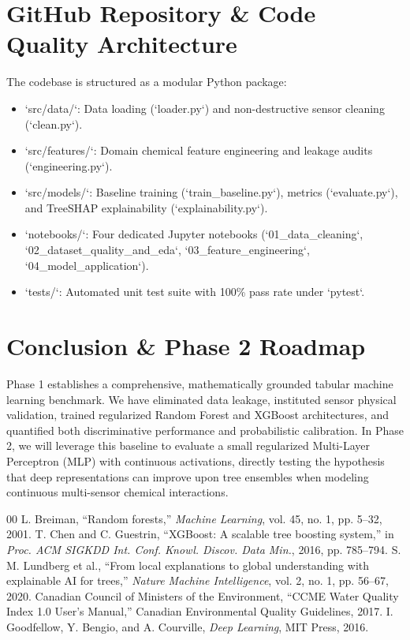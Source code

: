\documentclass[conference]{IEEEtran}
\begin{document}
\section{GitHub Repository \& Code Quality Architecture}
The codebase is structured as a modular Python package:
\begin{itemize}
    \item `src/data/`: Data loading (`loader.py`) and non-destructive sensor cleaning (`clean.py`).
    \item `src/features/`: Domain chemical feature engineering and leakage audits (`engineering.py`).
    \item `src/models/`: Baseline training (`train_baseline.py`), metrics (`evaluate.py`), and TreeSHAP explainability (`explainability.py`).
    \item `notebooks/`: Four dedicated Jupyter notebooks (`01_data_cleaning`, `02_dataset_quality_and_eda`, `03_feature_engineering`, `04_model_application`).
    \item `tests/`: Automated unit test suite with 100\% pass rate under `pytest`.
\end{itemize}

\section{Conclusion \& Phase 2 Roadmap}
Phase 1 establishes a comprehensive, mathematically grounded tabular machine learning benchmark. We have eliminated data leakage, instituted sensor physical validation, trained regularized Random Forest and XGBoost architectures, and quantified both discriminative performance and probabilistic calibration. In Phase 2, we will leverage this baseline to evaluate a small regularized Multi-Layer Perceptron (MLP) with continuous activations, directly testing the hypothesis that deep representations can improve upon tree ensembles when modeling continuous multi-sensor chemical interactions.

\begin{thebibliography}{00}
 L. Breiman, ``Random forests,'' \textit{Machine Learning}, vol. 45, no. 1, pp. 5--32, 2001.
 T. Chen and C. Guestrin, ``XGBoost: A scalable tree boosting system,'' in \textit{Proc. ACM SIGKDD Int. Conf. Knowl. Discov. Data Min.}, 2016, pp. 785--794.
 S. M. Lundberg et al., ``From local explanations to global understanding with explainable AI for trees,'' \textit{Nature Machine Intelligence}, vol. 2, no. 1, pp. 56--67, 2020.
 Canadian Council of Ministers of the Environment, ``CCME Water Quality Index 1.0 User's Manual,'' Canadian Environmental Quality Guidelines, 2017.
 I. Goodfellow, Y. Bengio, and A. Courville, \textit{Deep Learning}, MIT Press, 2016.
\end{thebibliography}
\end{document}
